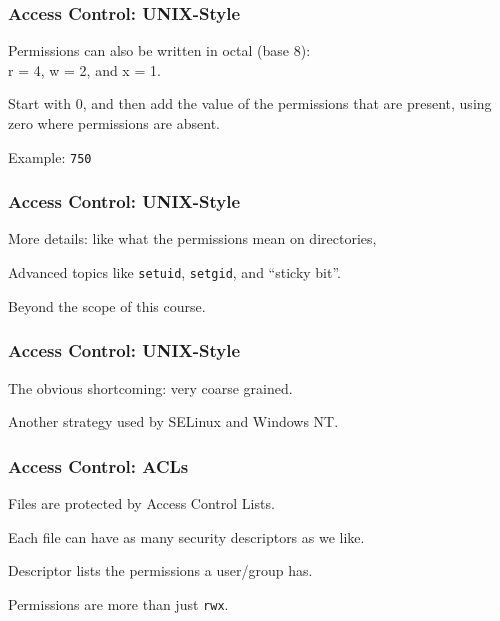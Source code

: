 \begin{frame}
\frametitle{Access Control: UNIX-Style}
\begin{changemargin}{1cm}

Permissions can also be written in octal (base 8): \\
\quad r = 4, w = 2, and x = 1. 

Start with 0, and then add the value of the  permissions that are present, using zero where permissions are absent. 

Example: \texttt{750} 

\end{changemargin}
\end{frame}

\begin{frame}
\frametitle{Access Control: UNIX-Style}
\begin{changemargin}{1cm}

More details: like what the permissions mean on directories, 

Advanced topics like \texttt{setuid}, \texttt{setgid}, and ``sticky bit''.

Beyond the scope of this course.

\end{changemargin}
\end{frame}

\begin{frame}
\frametitle{Access Control: UNIX-Style}
\begin{changemargin}{1cm}

The obvious shortcoming: very coarse grained.

Another strategy used by SELinux and Windows NT.

\end{changemargin}
\end{frame}

\begin{frame}
\frametitle{Access Control: ACLs}
\begin{changemargin}{1cm}

Files are protected by Access Control Lists.

Each file can have as many security descriptors as we like.

Descriptor lists the permissions a user/group has.

Permissions are more than just \texttt{rwx}.

\end{changemargin}
\end{frame}

